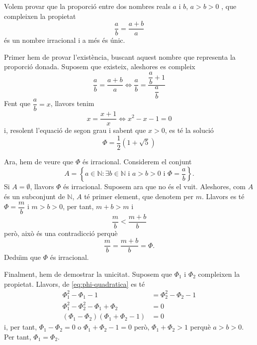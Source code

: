 \begin{exemple}
Volem provar que la proporci\'{o} entre dos nombres reals $a$ i $b$, $a>b>0$%
, que compleixen la propietat%
\begin{equation*}
\frac{a}{b}=\frac{a+b}{a}
\end{equation*}
\'{e}s un nombre irracional i a m\'{e}s \'{e}s \'{u}nic.
\end{exemple}

\begin{solucio}
Primer hem de provar l'exist\`{e}ncia, buscant aquest nombre que representa
la proporci\'{o} donada. Suposem que existeix, aleshores es compleix%
\begin{equation*}
\frac{a}{b}=\frac{a+b}{a}\Longleftrightarrow\frac{a}{b}=\frac{\dfrac{a}{b}+1%
}{\dfrac{a}{b}}
\end{equation*}
Fent que $\dfrac{a}{b}=x$, llavors tenim%
\begin{equation}
x=\frac{x+1}{x}\Longleftrightarrow x^{2}-x-1=0
\label{eq:phi-quadratica}
\end{equation}
i, resolent l'equaci\'{o} de segon grau i sabent que $x>0$, es t\'{e} la
soluci\'{o}%
\begin{equation*}
\Phi=\frac{1}{2}\left( 1+\sqrt{5}\right)
\end{equation*}

Ara, hem de veure que $\Phi$ \'{e}s irracional. Considerem el conjunt
\[
A=\left\{ a\in\mathbb{N}: \exists b\in\mathbb{N}\text{ i }a>b>0\text{ i }\Phi=\dfrac{a}{b}\right\}.
\]
Si $A=\emptyset$, llavors $\Phi$ \'{e}s
irracional. Suposem ara que no \'{e}s el vuit. Aleshores, com $A$ \'{e}s un
subconjunt de $\mathbb{N}$, $A$ t\'{e} primer element, que denotem per $m$.
Llavors es t\'{e} $\Phi=\dfrac{m}{b}$ i $m>b>0$, per tant, $m+b>m$ i%
\begin{equation*}
\dfrac{m}{b}<\frac{m+b}{b}
\end{equation*}
per\`{o}, aix\`{o} \'{e}s una contradicci\'{o} perqu\`{e}%
\begin{equation*}
\frac{m}{b}=\frac{m+b}{b}=\Phi\text{.}
\end{equation*}
Dedu\"{\i}m que $\Phi$ \'{e}s irracional.

Finalment, hem de demostrar la unicitat. Suposem que $\Phi_{1}$ i $\Phi_{2} $
compleixen la propietat. Llavors, de \eqref{eq:phi-quadratica} es t\'{e}%
\begin{align*}
\Phi_{1}^{2}-\Phi_{1}-1 & =\Phi_{2}^{2}-\Phi_{2}-1 \\
\Phi_{1}^{2}-\Phi_{2}^{2}-\Phi_{1}+\Phi_{2} & =0 \\
\left( \Phi_{1}-\Phi_{2}\right) \left( \Phi_{1}+\Phi_{2}-1\right) & =0
\end{align*}
i, per tant, $\Phi_{1}-\Phi_{2}=0$ o $\Phi_{1}+\Phi_{2}-1=0$ per\`{o}, $%
\Phi_{1}+\Phi_{2}>1$ perqu\`{e} $a>b>0$. Per tant, $\Phi_{1}=\Phi_{2}$.
\end{solucio}

